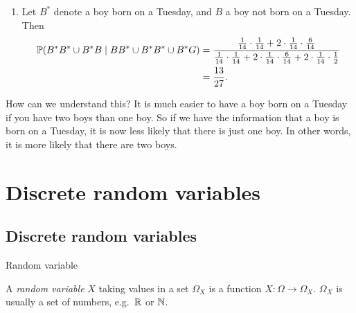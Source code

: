 \begin{note}
\begin{field}
\begin{eg}
\begin{enumerate}
        \item Let $B^*$ denote a boy born on a Tuesday, and $B$ a boy not born on a Tuesday. Then
          \begin{align*}
            \P(B^*B^* \cup B^*B\mid BB^* \cup B^*B^*\cup B^*G)&=\frac{\frac{1}{14}\cdot \frac{1}{14} + 2\cdot \frac{1}{14}\cdot\frac{6}{14}}{\frac{1}{14}\cdot \frac{1}{14} + 2\cdot \frac{1}{14}\cdot\frac{6}{14} + 2\cdot \frac{1}{14}\cdot \frac{1}{2}}\\
            &= \frac{13}{27}.
          \end{align*}
      \end{enumerate}
      How can we understand this? It is much easier to have a boy born on a Tuesday if you have two boys than one boy. So if we have the information that a boy is born on a Tuesday, it is now less likely that there is just one boy. In other words, it is more likely that there are two boys.
    \end{eg}
  \end{field}
  \xplain{}%
\end{note}

\section{Discrete random variables}

\subsection{Discrete random variables}

%
\begin{note}
  \begin{field}
    Random variable
  \end{field}
  \begin{field}
    \begin{defi}
      A \emph{random variable} $X$ taking values in a set $\Omega_X$ is a function $X: \Omega \to \Omega_X$. $\Omega_X$ is usually a set of numbers, e.g.\ $\R$ or $\N$.
    \end{defi}
  \end{field}
  \xplain{}%
\end{note}

